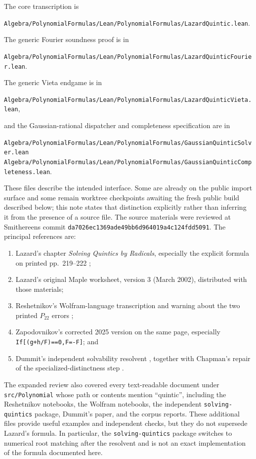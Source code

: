 \documentclass[11pt,a4paper,oneside]{article}
\newcommand{\lean}[1]{\nolinkurl{#1}}
\newcommand{\codepath}{\lean{Algebra/PolynomialFormulas/Lean/PolynomialFormulas/LazardQuintic.lean}}
\newcommand{\fouriercodepath}{\lean{Algebra/PolynomialFormulas/Lean/PolynomialFormulas/LazardQuinticFourier.lean}}
\newcommand{\vietacodepath}{\lean{Algebra/PolynomialFormulas/Lean/PolynomialFormulas/LazardQuinticVieta.lean}}
\newcommand{\solvercodepath}{\lean{Algebra/PolynomialFormulas/Lean/PolynomialFormulas/GaussianQuinticSolver.lean}}
\newcommand{\completenesscodepath}{\lean{Algebra/PolynomialFormulas/Lean/PolynomialFormulas/GaussianQuinticCompleteness.lean}}
\begin{document}
The core transcription is
\begin{center}
  \codepath.
\end{center}
The generic Fourier soundness proof is in
\begin{center}
  \fouriercodepath.
\end{center}
The generic Vieta endgame is in
\begin{center}
  \vietacodepath,
\end{center}
and the Gaussian-rational dispatcher and completeness specification are in
\begin{center}
  {\small\solvercodepath}\\[2pt]
  {\small\completenesscodepath}.
\end{center}
These files describe the intended interface.  Some are already on the public
import surface and some remain worktree checkpoints awaiting the fresh public
build described below; this note states that distinction explicitly rather
than inferring it from the presence of a source file.  The source
materials were reviewed at Smithereens commit
\lean{da7026ec1369ade49bb6d964019a4c124fdd5091}.  The principal references are:

\begin{enumerate}[label=(\arabic*)]
\item Lazard's chapter \emph{Solving Quintics by Radicals}, especially the
  explicit formula on printed pp.~219--222 \cite{Lazard2004};
\item Lazard's original Maple worksheet, version 3 (March 2002), distributed
  with those materials;
\item Reshetnikov's Wolfram-language transcription and warning about the two
  printed $P_{22}$ errors \cite{MSE};
\item Zapodovnikov's corrected 2025 version on the same page, especially
  \lean{If[(g+h/F)==0,F=-F]}; and
\item Dummit's independent solvability resolvent \cite{Dummit1991}, together
  with Chapman's repair of the specialized-distinctness step
  \cite{ChapmanNote}.
\end{enumerate}

The expanded review also covered every text-readable document under
\lean{src/Polynomial} whose path or contents mention ``quintic'', including the
Reshetnikov notebooks, the Wolfram notebooks, the independent
\lean{solving-quintics} package, Dummit's paper, and the corpus reports.  These
additional files provide useful examples and independent checks, but they do
not supersede Lazard's formula.  In particular, the
\lean{solving-quintics} package switches to numerical root matching after the
resolvent and is not an exact implementation of the formula documented here.
\end{document}
